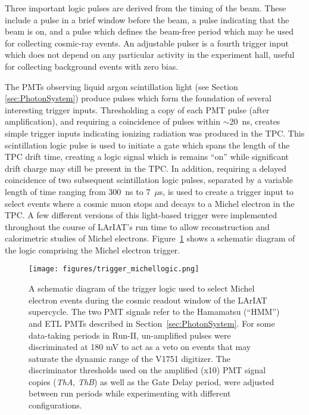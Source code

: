 Three important logic pulses are derived from the timing of the beam.  These include a pulse in a brief window before the beam, a pulse indicating that the beam is on, and a pulse which defines the beam-free period which may be used for collecting cosmic-ray events.  An adjustable pulser is a fourth trigger input which does not depend on any particular activity in the experiment hall,  useful for collecting background events with zero bias. 

The PMTs observing liquid argon scintillation light (see Section \ref{sec:PhotonSystem}) produce pulses which form the foundation of several interesting trigger inputs.  Thresholding a copy of each PMT pulse (after amplification), and requiring a coincidence of pulses within $\sim$20~ns, creates simple trigger inputs indicating ionizing radiation was produced in the TPC.  This scintillation logic pulse is used to initiate a gate which spans the length of the TPC drift time, creating a logic signal which is remains ``on'' while significant drift charge may still be present in the TPC.  In addition, requiring a delayed coincidence of two subsequent scintillation logic pulses, separated by a variable length of time ranging from 300~ns to 7~$\mu$s, is used to create a trigger input to select events where a cosmic muon stops and decays to a Michel electron in the TPC.  A few different versions of this light-based trigger were implemented throughout the course of LArIAT's run time to allow reconstruction and calorimetric studies of Michel electrons. Figure~\ref{michel_logic} shows a schematic diagram of the logic comprising the Michel electron trigger. 

\begin{figure}
\texttt{[image: figures/trigger\_michellogic.png]}
\caption{\label{michel_logic}A schematic diagram of the trigger logic used to select Michel electron events during the cosmic readout window of the LArIAT supercycle.  The two PMT signals refer to the Hamamatsu (``HMM'') and ETL PMTs described in Section~\ref{sec:PhotonSystem}.  For some data-taking periods in Run-II, un-amplified pulses were discriminated at 180 mV to act as a veto on events that may saturate the dynamic range of the V1751 digitizer.  The discriminator thresholds used on the amplified (x10) PMT signal copies (\emph{ThA}, \emph{ThB}) as well as the Gate Delay period, were adjusted between run periods while experimenting with different configurations.}
\end{figure}

